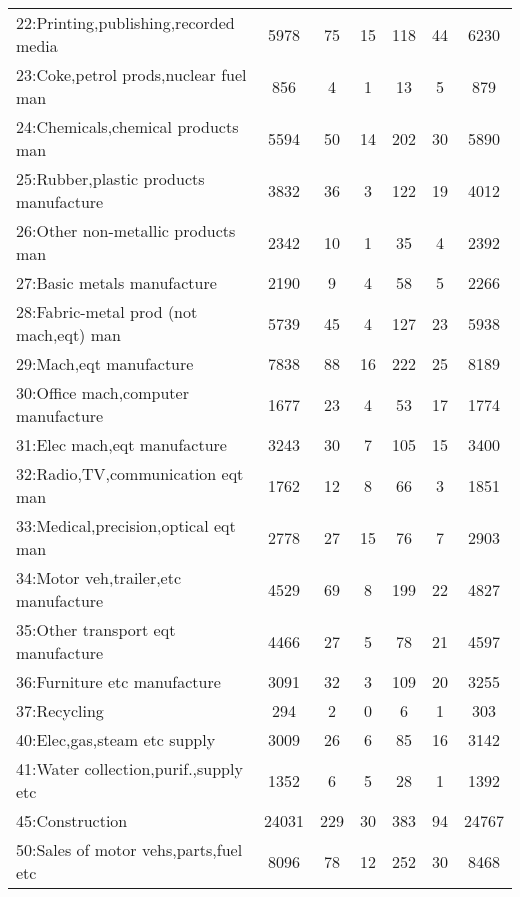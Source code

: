 {\begin{longtable}{l*{6}{c}}
22:Printing,publishing,recorded media&     5978&       75&       15&      118&       44&     6230\\
23:Coke,petrol prods,nuclear fuel man&      856&        4&        1&       13&        5&      879\\
24:Chemicals,chemical products man&     5594&       50&       14&      202&       30&     5890\\
25:Rubber,plastic products manufacture&     3832&       36&        3&      122&       19&     4012\\
26:Other non-metallic products man&     2342&       10&        1&       35&        4&     2392\\
27:Basic metals manufacture&     2190&        9&        4&       58&        5&     2266\\
28:Fabric-metal prod (not mach,eqt) man&     5739&       45&        4&      127&       23&     5938\\
29:Mach,eqt manufacture&     7838&       88&       16&      222&       25&     8189\\
30:Office mach,computer manufacture&     1677&       23&        4&       53&       17&     1774\\
31:Elec mach,eqt manufacture&     3243&       30&        7&      105&       15&     3400\\
32:Radio,TV,communication eqt man&     1762&       12&        8&       66&        3&     1851\\
33:Medical,precision,optical eqt man&     2778&       27&       15&       76&        7&     2903\\
34:Motor veh,trailer,etc manufacture&     4529&       69&        8&      199&       22&     4827\\
35:Other transport eqt manufacture&     4466&       27&        5&       78&       21&     4597\\
36:Furniture etc manufacture&     3091&       32&        3&      109&       20&     3255\\
37:Recycling&      294&        2&        0&        6&        1&      303\\
40:Elec,gas,steam etc supply&     3009&       26&        6&       85&       16&     3142\\
41:Water collection,purif.,supply etc&     1352&        6&        5&       28&        1&     1392\\
45:Construction&    24031&      229&       30&      383&       94&    24767\\
50:Sales of motor vehs,parts,fuel etc&     8096&       78&       12&      252&       30&     8468\\

\end{longtable}}
